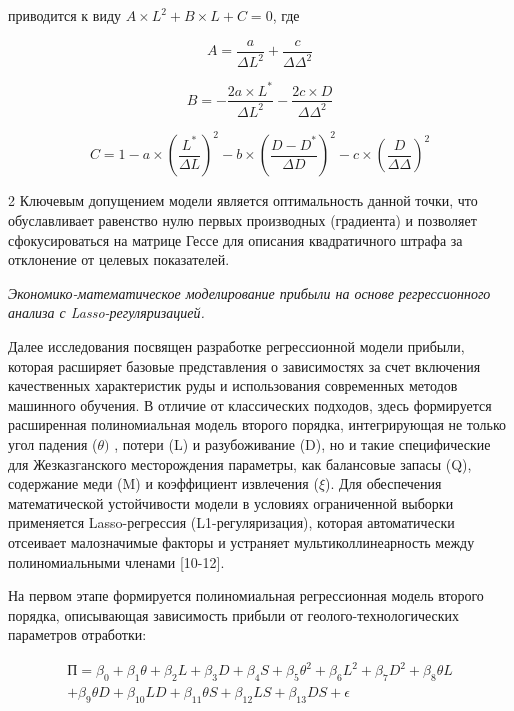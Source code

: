 приводится к виду \(A \times L^{2} + B \times L + C = 0\), где

\begin{equation}
A = \frac{a}{{\Delta L}^{2}} + \frac{c}{{\Delta \Delta }^{2}}
\end{equation}

\begin{equation}
B = - \frac{2a \times L^{*}}{{\Delta L}^{2}} - \frac{2c \times D}{{\Delta \Delta }^{2}}
\end{equation}

\begin{equation}
C = 1 - a \times \left( \frac{L^{*}}{\Delta L} \right)^{2} - b \times \left( \frac{D - D^{*}}{\Delta D} \right)^{2} - c \times \left( \frac{D}{\Delta \Delta } \right)^{2}
\end{equation}

\begin{multicols}{2}
Ключевым допущением модели является оптимальность данной точки, что
обуславливает равенство нулю первых производных (градиента) и позволяет
сфокусироваться на матрице Гессе для описания квадратичного штрафа за
отклонение от целевых показателей.

\emph{Экономико-математическое моделирование прибыли на основе
регрессионного анализа с Lasso-регуляризацией.}

Далее исследования посвящен разработке регрессионной модели прибыли,
которая расширяет базовые представления о зависимостях за счет включения
качественных характеристик руды и использования современных методов
машинного обучения. В отличие от классических подходов, здесь
формируется расширенная полиномиальная модель второго порядка,
интегрирующая не только угол падения (\(\theta)\) , потери (L) и
разубоживание (D), но и такие специфические для Жезказганского
месторождения параметры, как балансовые запасы (Q), содержание меди (M)
и коэффициент извлечения (\(\xi\)). Для обеспечения математической
устойчивости модели в условиях ограниченной выборки применяется
Lasso-регрессия (L1-регуляризация), которая автоматически отсеивает
малозначимые факторы и устраняет мультиколлинеарность между
полиномиальными членами {[}10-12{]}.

На первом этапе формируется полиномиальная регрессионная модель второго
порядка, описывающая зависимость прибыли от геолого-технологических
параметров отработки:
\end{multicols}
\vspace{-1cm}
\begin{multline}
П = \beta_{0} + \beta_{1}\theta + \beta_{2} L + \beta_{3} D + \beta_{4} S + \beta_{5}\theta^{2} + \beta_{6} L^{2} + \beta_{7} D^{2} + \beta_{8}\theta L \\
+ \beta_{9}\theta D + \beta_{10} LD + \beta_{11}\theta S + \beta_{12} LS + \beta_{13} DS + \epsilon
\end{multline}

